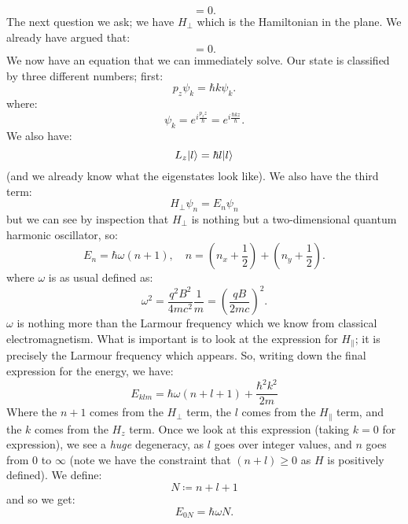 \begin{equation}
    [p_z, L_z] = 0.
\end{equation}
The next question we ask; we have $H_\perp$ which is the Hamiltonian in the plane. We already have argued that:
\begin{equation}
    [L_z, H_\perp] = 0.
\end{equation}
We now have an equation that we can immediately solve. Our state is classified by three different numbers; first:
\begin{equation}
    p_z\psi_k = \hbar k \psi_k.
\end{equation}
where:
\begin{equation}
    \psi_k =  e^{i\frac{p_z z}{\hbar}} = e^{i\frac{\hbar k z}{\hbar}}.
\end{equation}
We also have:
\begin{equation}
    L_z\lvert l \rangle = \hbar l \lvert l \rangle
\end{equation}
(and we already know what the eigenstates look like). We also have the third term:
\begin{equation}
    H_\perp \psi_n = E_n \psi_n
\end{equation}
but we can see by inspection that $H_\perp$ is nothing but a two-dimensional quantum harmonic oscillator, so:
\begin{equation}
    E_n = \hbar \omega (n + 1), \quad n = (n_x + \frac{1}{2}) + (n_y + \frac{1}{2}).
\end{equation}
where $\omega$ is as usual defined as:
\begin{equation}
    \omega^2 = \frac{q^2B^2}{4mc^2}\frac{1}{m} = \left(\frac{qB}{2mc}\right)^2.
\end{equation}
$\omega$ is nothing more than the Larmour frequency which we know from classical electromagnetism. What is important is to look at the expression for $H_\parallel$; it is precisely the Larmour frequency which appears. So, writing down the final expression for the energy, we have:
\begin{equation}
    E_{klm} = \hbar \omega(n + l + 1) + \frac{\hbar^2 k^2}{2m}
\end{equation}
Where the $n + 1$ comes from the $H_\perp$ term, the $l$ comes from the $H_\parallel$ term, and the $k$ comes from the $H_z$ term. Once we look at this expression (taking $k = 0$ for expression), we see a \emph{huge} degeneracy, as $l$ goes over integer values, and $n$ goes from $0$ to $\infty$ (note we have the constraint that $(n + l) \geq 0$ as $H$ is positively defined). We define:
\begin{equation}
    N \coloneqq n + l + 1
\end{equation}
and so we get:
\begin{equation}
    E_{0N} = \hbar \omega N.
\end{equation}

